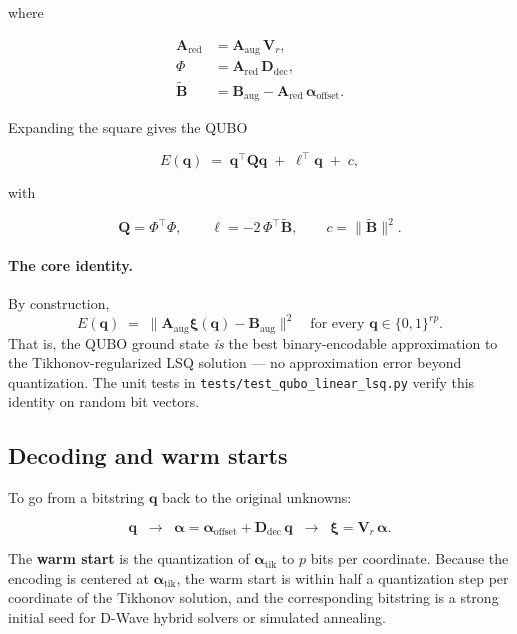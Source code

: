 \documentclass[8pt,a4paper]{article}
\newcommand{\bvec}[1]{\bm{#1}}
\newcommand{\Amat}{\bvec{A}}
\newcommand{\Bmat}{\bvec{B}}
\newcommand{\Qmat}{\bvec{Q}}
\newcommand{\Vr}{\bvec{V}_r}
\newcommand{\Ddec}{\bvec{D}_{\mathrm{dec}}}
\theoremstyle{definition}
\theoremstyle{remark}
\begin{document}
where

\begin{align}
  \Amat_{\mathrm{red}} &= \Amat_{\mathrm{aug}}\, \Vr, \\
  \Phi                 &= \Amat_{\mathrm{red}}\,\Ddec, \\
  \tilde{\Bmat}        &= \Bmat_{\mathrm{aug}} - \Amat_{\mathrm{red}}\,\bm\alpha_{\mathrm{offset}}.
\end{align}

Expanding the square gives the QUBO

\begin{equation}
\boxed{
  E(\bvec{q}) \;=\; \bvec{q}^{\top} \Qmat \bvec{q}
              \;+\; \bvec\ell^{\top}\bvec{q}
              \;+\; c,
}
\end{equation}

with

\begin{equation}
  \Qmat = \Phi^{\top}\Phi,\qquad
  \bvec\ell = -2\,\Phi^{\top}\tilde{\Bmat},\qquad
  c = \|\tilde{\Bmat}\|^2.
\end{equation}

\paragraph{The core identity.}
By construction,
\begin{equation}
  E(\bvec{q}) \;=\; \|\Amat_{\mathrm{aug}} \bm\xi(\bvec{q}) - \Bmat_{\mathrm{aug}}\|^2
  \quad\text{for every }\bvec{q}\in\{0,1\}^{rp}.
\end{equation}
That is, the QUBO ground state \emph{is} the best binary-encodable
approximation to the Tikhonov-regularized LSQ solution --- no
approximation error beyond quantization. The unit tests in
\texttt{tests/test\_qubo\_linear\_lsq.py} verify this identity on
random bit vectors.

\subsection{Decoding and warm starts}

To go from a bitstring $\bvec{q}$ back to the original unknowns:

\begin{equation}
  \bvec{q} \;\;\longrightarrow\;\;
  \bm\alpha = \bm\alpha_{\mathrm{offset}} + \Ddec\,\bvec{q}
  \;\;\longrightarrow\;\;
  \bm\xi = \Vr\,\bm\alpha.
\end{equation}

The \textbf{warm start} is the quantization of $\bm\alpha_{\mathrm{tik}}$
to $p$ bits per coordinate. Because the encoding is centered at
$\bm\alpha_{\mathrm{tik}}$, the warm start is within half a quantization
step per coordinate of the Tikhonov solution, and the corresponding
bitstring is a strong initial seed for D-Wave hybrid solvers or
simulated annealing.
\end{document}
